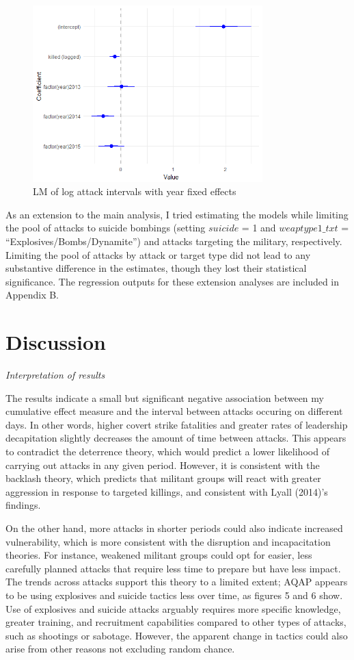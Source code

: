 \documentclass[letterpaper,12pt]{article}
\theoremstyle{definition}
\begin{document}
\begin{figure}[htb!]
\begin{center}
\caption {LM of log attack intervals with year fixed effects}
  \includegraphics[width=3.5in]{coef_plot.png}
\end{center}
\end{figure}

As an extension to the main analysis, I tried estimating the models while limiting the pool of attacks to suicide bombings (setting $suicide$ = 1 and $weaptype1\_txt$ = ``Explosives/Bombs/Dynamite'') and attacks targeting the military, respectively. Limiting the pool of attacks by attack or target type did not lead to any substantive difference in the estimates, though they lost their statistical significance.  The regression outputs for these extension analyses are included in Appendix B.

\section{Discussion}

\noindent\textit{Interpretation of results}

The results indicate a small but significant negative association between my cumulative effect measure and the interval between attacks occuring on different days. In other words, higher covert strike fatalities and greater rates of leadership decapitation slightly decreases the amount of time between attacks. This appears to contradict the deterrence theory, which would predict a lower likelihood of carrying out attacks in any given period. However, it is consistent with the backlash theory, which predicts that militant groups will react with greater aggression in response to targeted killings, and consistent with Lyall (2014)'s findings. 

On the other hand, more attacks in shorter periods could also indicate increased vulnerability, which is more consistent with the disruption and incapacitation theories. For instance, weakened militant groups could opt for easier, less carefully planned attacks that require less time to prepare but have less impact. The trends across attacks support this theory to a limited extent; AQAP appears to be using explosives and suicide tactics less over time, as figures 5 and 6 show. Use of explosives and suicide attacks arguably requires more specific knowledge, greater training, and recruitment capabilities compared to other types of attacks, such as shootings or sabotage. However, the apparent change in tactics could also arise from other reasons not excluding random chance.
\end{document}

